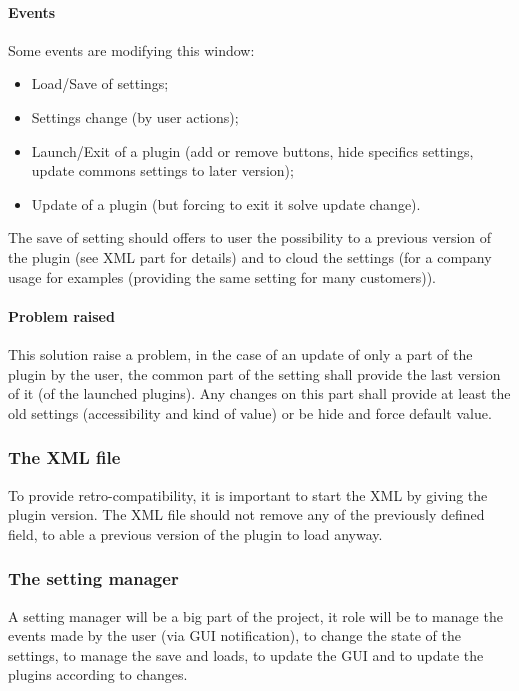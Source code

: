 \paragraph*{Events}

Some events are modifying this window:
\begin{itemize}
	\item Load/Save of settings;
	\item Settings change (by user actions);
	\item Launch/Exit of a plugin (add or remove buttons, hide specifics settings, update commons settings to later version);
	\item Update of a plugin (but forcing to exit it solve update change).
\end{itemize}

The save of setting should offers to user the possibility to a previous version of the plugin (see XML part for details) and to cloud the settings (for a company usage for examples (providing the same setting for many customers)).

\paragraph*{Problem raised}

This solution raise a problem, in the case of an update of only a part of the plugin by the user, the common part of the setting shall provide the last version of it (of the launched plugins). Any changes on this part shall provide at least the old settings (accessibility and kind of value) or be hide and force default value.






\subsubsection{The XML file}

To provide retro-compatibility, it is important to start the XML by giving the plugin version. The XML file should not remove any of the previously defined field, to able a previous version of the plugin to load anyway.


\subsubsection{The setting manager}

A setting manager will be a big part of the project, it role will be to manage the events made by the user (via GUI notification), to change the state of the settings, to manage the save and loads, to update the GUI and to update the plugins according to changes.

